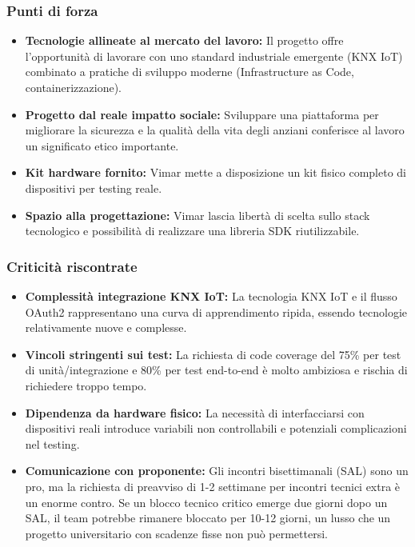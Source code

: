 \documentclass{article}
\begin{document}
	\subsubsection{Punti di forza}
	\begin{itemize}
		\item \textbf{Tecnologie allineate al mercato del lavoro:} Il progetto offre l’opportunità di lavorare con uno standard industriale emergente (KNX IoT) combinato a pratiche di sviluppo moderne (Infrastructure as Code, containerizzazione).
		\item \textbf{Progetto dal reale impatto sociale:} Sviluppare una piattaforma per migliorare la sicurezza e la qualità della vita degli anziani conferisce al lavoro un significato etico importante.
        \item \textbf{Kit hardware fornito:} Vimar mette a disposizione un kit fisico completo di dispositivi per testing reale.
		\item \textbf{Spazio alla progettazione:} Vimar lascia libertà di scelta sullo stack tecnologico e possibilità di realizzare una libreria SDK riutilizzabile.
	\end{itemize}
	
	\subsubsection{Criticità riscontrate}
	\begin{itemize}
		\item \textbf{Complessità integrazione KNX IoT:} La tecnologia KNX IoT e il flusso OAuth2 rappresentano una curva di apprendimento ripida, essendo tecnologie relativamente nuove e complesse.
		\item \textbf{Vincoli stringenti sui test:} La richiesta di code coverage del 75\% per test di unità/integrazione e 80\% per test end-to-end è molto ambiziosa e rischia di richiedere troppo tempo.
		\item \textbf{Dipendenza da hardware fisico:} La necessità di interfacciarsi con dispositivi reali introduce variabili non controllabili e potenziali complicazioni nel testing.
        \item \textbf{Comunicazione con proponente:} Gli incontri bisettimanali (SAL) sono un pro, ma la richiesta di preavviso di 1-2 settimane per incontri tecnici extra è un enorme contro. Se un blocco tecnico critico emerge due giorni dopo un SAL, il team potrebbe rimanere bloccato per 10-12 giorni, un lusso che un progetto universitario con scadenze fisse non può permettersi.
	\end{itemize}
	
\end{document}
